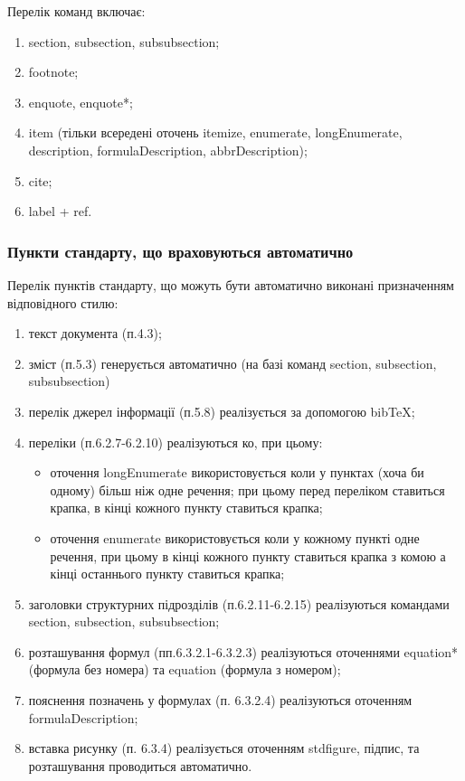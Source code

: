 Перелік команд включає:
\begin{enumerate}
  \item section, subsection, subsubsection;
  \item footnote;
  \item enquote, enquote*;
  \item item (тільки всередені оточень itemize, enumerate, longEnumerate,
  description, formulaDescription, abbrDescription);
  \item cite;
  \item label + ref.
\end{enumerate}

\subsubsection{Пункти стандарту, що враховуються автоматично}\label{sec:auto}

Перелік пунктів стандарту, що можуть бути автоматично виконані призначенням відповідного стилю:
\begin{enumerate}
\item текст документа (п.4.3);
\item зміст (п.5.3) генерується автоматично (на базі команд section, subsection, subsubsection)
\item перелік джерел інформації (п.5.8) реалізується за допомогою bibTeX;
\item переліки (п.6.2.7-6.2.10) реалізуються ко, при цьому:
\begin{itemize}
  \item оточення longEnumerate використовується коли у пунктах (хоча би одному) більш ніж одне речення; при цьому перед переліком ставиться крапка, в кінці кожного пункту ставиться крапка;
  \item оточення enumerate використовується коли у кожному пункті одне речення, при цьому в кінці кожного пункту ставиться крапка з комою а кінці останнього пункту ставиться крапка;
\end{itemize}
\item заголовки структурних підрозділів (п.6.2.11-6.2.15) реалізуються командами section, subsection, subsubsection;
\item розташування формул (пп.6.3.2.1-6.3.2.3) реалізуються оточеннями equation* (формула без номера) та equation (формула з номером);
\item пояснення позначень у формулах (п. 6.3.2.4) реалізуються оточенням formulaDescription;
\item вставка рисунку (п. 6.3.4) реалізується оточенням stdfigure, підпис, та розташування проводиться автоматично.
\end{enumerate}

